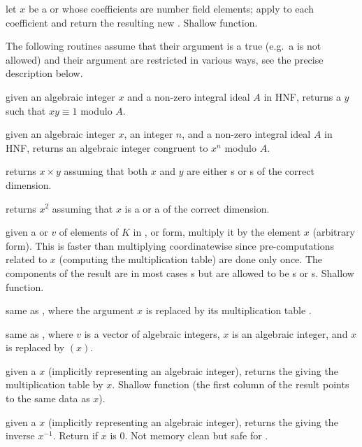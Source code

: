  let $x$ be a  or
 whose coefficients
are number field elements; apply  to each
coefficient and return the resulting new . Shallow function.

 The following routines assume that their 
argument is a true  (e.g.~a  is not allowed) and their
argument are restricted in various ways, see the precise description below.

 given an algebraic integer
$x$ and a non-zero integral ideal $A$ in HNF, returns a $y$ such that
$xy \equiv 1$ modulo $A$.

 given an algebraic
integer $x$, an integer $n$, and a non-zero integral ideal $A$ in HNF,
returns an algebraic integer congruent to $x^n$ modulo $A$.

 returns $x\times y$ assuming
that both $x$ and $y$ are either s or s of the correct
dimension.

 returns $x^2$ assuming that $x$ is a 
or a  of the correct dimension.

 given a  or 
$v$ of elements of $K$ in ,  or  form, multiply
it by the element $x$ (arbitrary form). This is faster than multiplying
coordinatewise since pre-computations related to $x$ (computing the
multiplication table) are done only once. The components of the result
are in most cases s but are allowed to be s or s.
Shallow function.

 same as ,
where the argument $x$ is replaced by its multiplication table .

 same as ,
where $v$ is a vector of algebraic integers, $x$ is an algebraic
integer, and $x$ is replaced by $(x)$.

 given a  $x$ (implicitly
representing an algebraic integer), returns the  giving the
multiplication table by $x$. Shallow function (the first column of the result
points to the same data as $x$).

 given a  $x$ (implicitly
representing an algebraic integer), returns the  giving the
inverse $x^{-1}$. Return  if $x$ is $0$.
Not memory clean but safe for .

